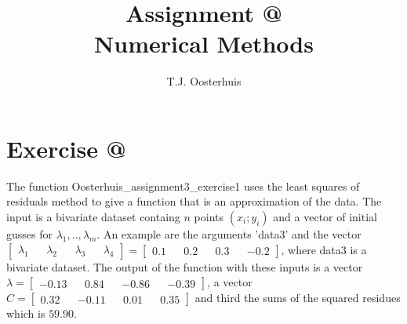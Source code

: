 \documentclass[12pt]{article}
\makeatletter
\newcommand*{\rom}[1]{\expandafter\@slowromancap\romannumeral #1@}
\makeatother
\begin{document}
 
 
\title{Assignment \rom{3} \\
\large Numerical Methods} 
\author{T.J. Oosterhuis}
\maketitle
%
\section*{Exercise \rom{1}}
The function Oosterhuis\_assignment3\_exercise1 uses the least squares of residuals method to give a function that is an approximation of the data. The input is a bivariate dataset containg $n$ points $(x_i;y_i)$ and a vector of initial gusses for $\lambda_1,..,\lambda_m.$ An example are the arguments 'data3' and the vector $\begin{bmatrix} \lambda_1 && \lambda_2 && \lambda_3 && \lambda_4 \end{bmatrix} =  \begin{bmatrix} 0.1 && 0.2 && 0.3 && -0.2 \end{bmatrix}$, where data3 is a bivariate dataset. The output of the function with these inputs is a vector $\lambda = \begin{bmatrix} -0.13 && 0.84 && -0.86 && -0.39 \end{bmatrix}$, a vector $C = \begin{bmatrix} 0.32 && -0.11 && 0.01 && 0.35 \end{bmatrix}$  and third the sums of the squared residues which is $59.90$.
\end{document}
